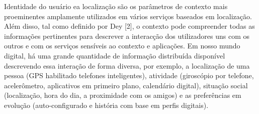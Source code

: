 \documentclass[12pt]{article} %
\begin{document}

Identidade do usuário ea localização são os parâmetros de contexto mais proeminentes amplamente utilizados em vários serviços baseados em localização. Além disso, tal como definido por Dey [2], o contexto pode compreender todas as informações pertinentes para descrever a interacção dos utilizadores uns com os outros e com os serviços sensíveis ao contexto e aplicações. Em nosso mundo digital, há uma grande quantidade de informação distribuída disponível descrevendo essa interação de forma diversa, por exemplo, a localização de uma pessoa (GPS habilitado telefones inteligentes), atividade (giroscópio por telefone, acelerômetro, aplicativos em primeiro plano, calendário digital), situação social (localização, hora do dia, a proximidade com os amigos) e as preferências em evolução (auto-configurado e história com base em perfis digitais).

\end{document}
